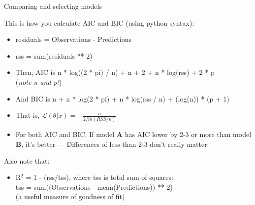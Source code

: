 \documentclass[xcolor=x11names,compress]{beamer}
\renewcommand{\(}{\begin{columns}}
\renewcommand{\)}{\end{columns}}
\newcommand{\<}[1]{\begin{column}{#1}}
\renewcommand{\>}{\end{column}}
\begin{document}

\begin{frame}{Comparing and selecting models}

This is how you calculate AIC and BIC (using python syntax): 

\pause
\begin{itemize}\itemsep10pt
\small
	\item residuals = Observations - Predictions
	\item rss = sum(residuals ** 2) 
	\item Then, AIC is n * log((2 * pi) / n) + n + 2 + n * log(rss) + 2 * p \\
		({\it note n and p!})
	\item And BIC is n + n * log(2 * pi) + n * log(rss / n) + (log(n)) * (p + 1)

	\item That is, 	$ \mathcal{L}(\theta |x) = -\frac{n}{2/ln(RSS/n)}$
	\item For both AIC and BIC, If model {\bf A} has AIC lower by 2-3 or 
	more than model {\bf B}, it's better --- Differences of less than 2-3 
	don't really matter

\end{itemize}

    \pause
Also note that:
\begin{itemize}
\small
	\item R$^{2}$ = 1 - (rss$/$tss), where tss is total sum of squares: \\
tss = sum((Observations - mean(Predictions)) ** 2)\\
(a useful measure of goodness of fit)

\end{itemize}

\end{frame}

\end{document}
